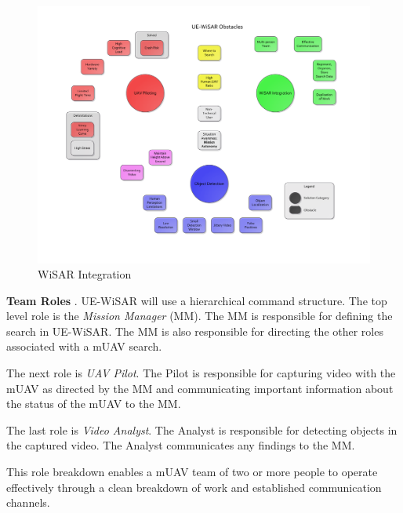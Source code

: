 \documentclass[12pt]{IEEEtran}
\begin{document}
\begin{figure}[htp]
	\vspace{-90pt}
	\hspace{-80pt}
	\includegraphics[keepaspectratio=true, width=\paperheight,
	height=\paperheight, page=2, angle=90, scale=0.95,
	trim=10 0 10 0]{obstacle_solution_map.pdf}
	\caption{WiSAR Integration}
	\label{fig:wisarintegrationmap}
\end{figure}

\textbf{Team Roles} \cite{goodrich2008supporting,adams2009cognitive,goodrich2007using}.  UE-WiSAR will use a hierarchical command structure.
The top level role is the \emph{Mission Manager} (MM).  The MM is responsible
for defining the search in UE-WiSAR.  The MM is also responsible for directing
the other roles associated with a mUAV search.

The next role is \emph{UAV Pilot}.  The Pilot is responsible for capturing video with the
mUAV as directed by the MM and communicating important information about the
status of the mUAV to the MM.  

The last role is \emph{Video Analyst}.  The
Analyst is responsible for detecting objects in the captured video.
The Analyst communicates any findings to the MM.  

This role breakdown enables a
mUAV team of two or more people to operate effectively through a clean breakdown
of work and established communication channels.
\end{document}
